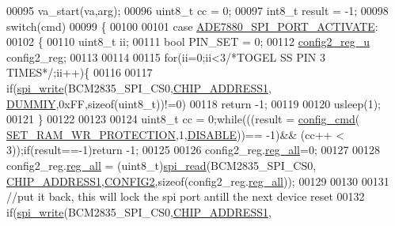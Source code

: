 \begin{DoxyCode}
00095            va\_start(va,arg);
00096            uint8\_t cc = 0;
00097            int8\_t result = -1;
00098         \textcolor{keywordflow}{switch}(cmd)
00099         \{
00100            
00101                 \textcolor{keywordflow}{case}  \hyperlink{a00043_a430d76623597b550145ee76e95e84c48}{ADE7880\_SPI\_PORT\_ACTIVATE}:
00102                 \{
00110                     uint8\_t ii;
00111                     \textcolor{keywordtype}{bool} PIN\_SET = 0;
00112                     \hyperlink{a00022}{config2\_reg\_u} config2\_reg;
00113                     
00114                     
00115                     \textcolor{keywordflow}{for}(ii=0;ii<3\textcolor{comment}{/*TOGEL SS PIN 3 TIMES*/};ii++)\{
00116      
00117                         \textcolor{keywordflow}{if}(\hyperlink{a00007_ga2770219ad8ad1eda1817c0df934b47d0}{spi\_write}(BCM2835\_SPI\_CS0,\hyperlink{a00037_a94de2b046db6e10257ef4481c0a15eaa}{CHIP\_ADDRESS1},
      \hyperlink{a00036_aa2594962ecec33d43f5b8dea993068ca}{DUMMIY},0xFF,\textcolor{keyword}{sizeof}(uint8\_t))!=0)
00118                             \textcolor{keywordflow}{return} -1; 
00119                             
00120                         usleep(1);
00121                     \}
00122                       
00123                     
00124                      uint8\_t cc = 0;\textcolor{keywordflow}{while}(((result = \hyperlink{a00005_ga369ee0e8379941cbc2c79b90ec3292da}{config\_cmd}(
      \hyperlink{a00043_a5b534b9caab512045a6e762f3930a501}{SET\_RAM\_WR\_PROTECTION},1,\hyperlink{a00037_a99496f7308834e8b220f7894efa0b6ab}{DISABLE}))== -1)&& (cc++ < 3));\textcolor{keywordflow}{if}(result==-1)\textcolor{keywordflow}{return} -1; 
00125                      
00126                       config2\_reg.\hyperlink{a00022_ab2957613fa7f241407cc98e80676dccf}{reg\_all}=0;
00127             
00128                      config2\_reg.\hyperlink{a00022_ab2957613fa7f241407cc98e80676dccf}{reg\_all} = (uint8\_t)\hyperlink{a00007_ga7ad9f65ee46aca507374096506a0b1c4}{spi\_read}(BCM2835\_SPI\_CS0,
      \hyperlink{a00037_a94de2b046db6e10257ef4481c0a15eaa}{CHIP\_ADDRESS1},\hyperlink{a00036_a9989dac1034e36497f2f4f81613cab88}{CONFIG2},\textcolor{keyword}{sizeof}(config2\_reg.\hyperlink{a00022_ab2957613fa7f241407cc98e80676dccf}{reg\_all}));
00129                     
00130              
00131                    \textcolor{comment}{//put it back, this will lock the spi port antill the next device reset  }
00132                      \textcolor{keywordflow}{if}(\hyperlink{a00007_ga2770219ad8ad1eda1817c0df934b47d0}{spi\_write}(BCM2835\_SPI\_CS0,\hyperlink{a00037_a94de2b046db6e10257ef4481c0a15eaa}{CHIP\_ADDRESS1},

\end{DoxyCode}

